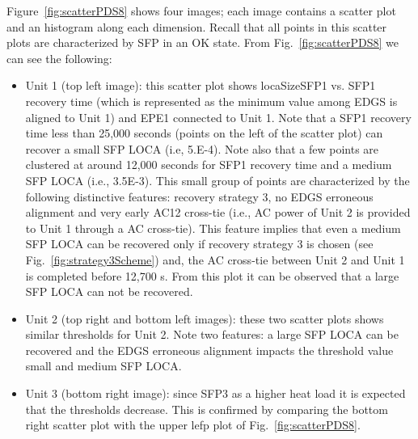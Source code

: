 Figure~\ref{fig:scatterPDS8} shows four images; each image contains a scatter plot and an histogram along each 
dimension. Recall that all points in this scatter plots are characterized by SFP in an OK state.
From Fig.~\ref{fig:scatterPDS8} we can see the following:
\begin{itemize}
  \item Unit 1 (top left image): this scatter plot shows locaSizeSFP1 vs. SFP1 recovery time (which is represented 
        as the minimum value among EDGS is aligned to Unit 1) and EPE1 connected to Unit 1. Note that a SFP1 recovery 
        time less than 25,000 seconds (points on the left of the scatter plot) can recover a small SFP LOCA (i.e, 5.E-4). 
        Note also that a few points are clustered at around 12,000 seconds for SFP1 recovery time and a medium SFP LOCA (i.e., 3.5E-3). 
        This small group of points are characterized by the following distinctive features: recovery strategy 3, no EDGS erroneous 
        alignment and very early AC12 cross-tie (i.e., AC power of Unit 2 is provided to Unit 1 through a AC 
        cross-tie). This feature implies that even a medium SFP LOCA can be recovered only if recovery strategy 3 is
        chosen (see Fig.~\ref{fig:strategy3Scheme}) and, the AC cross-tie between Unit 2 and Unit 1 is completed 
        before 12,700 s. From this plot it can be observed that a large SFP LOCA can not be recovered.
  \item Unit 2 (top right and bottom left images): these two scatter plots shows similar thresholds for Unit 2. 
        Note two features: a large SFP LOCA can be recovered and the EDGS erroneous alignment impacts the threshold value 
        small and medium SFP LOCA.
  \item Unit 3 (bottom right image): since SFP3 as a higher heat load it is expected that the thresholds decrease. This
        is confirmed by comparing the bottom right scatter plot with the upper lefp plot of Fig.~\ref{fig:scatterPDS8}.
\end{itemize}


